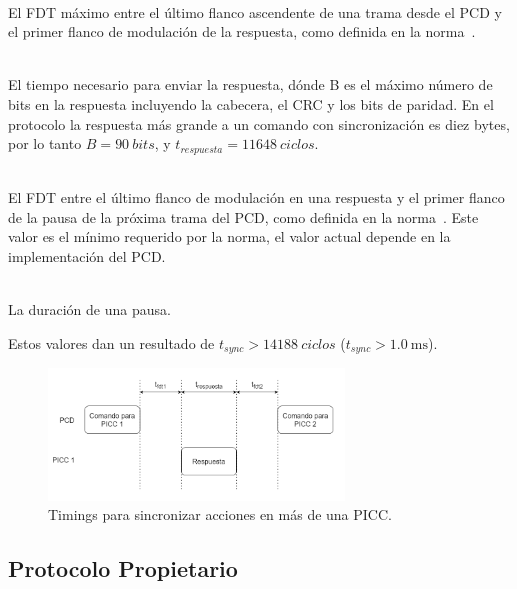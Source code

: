 \documentclass[a4paper, twoside, 11pt]{report}
\begin{document}
\begin{description}[font=\normalfont]
  \item[$t_{fdt1} = 1236$ ciclos:] \hfill \\ El FDT máximo entre el último flanco ascendente de una trama desde el PCD y el primer flanco de modulación de la respuesta, como definida en la norma~\cite{iso14443-3}.
  \item[$t_{respuesta} = 128 \left(B + 1\right)$ ciclos:] \hfill \\ El tiempo necesario para enviar la respuesta, dónde B es el máximo número de bits en la respuesta incluyendo la cabecera, el CRC y los bits de paridad. En el protocolo la respuesta más grande a un comando con sincronización es diez bytes, por lo tanto $B = \SI{90}{bits}$, y $t_{respuesta} = \SI{11648}{ciclos}$.
  \item[$t_{fdt2} = 1272$ ciclos:] \hfill \\ El FDT entre el último flanco de modulación en una respuesta y el primer flanco de la pausa de la próxima trama del PCD, como definida en la norma~\cite{iso14443-3}. Este valor es el mínimo requerido por la norma, el valor actual depende en la implementación del PCD.
  \item[$t_p \approx 32$ ciclos:] \hfill \\ La duración de una pausa.
\end{description}

Estos valores dan un resultado de $t_{sync} > \SI{14188}{ciclos}$ ($t_{sync} > \SI{1.0}{\milli\second}$).

\begin{figure}[htb]
  \centering
  \includegraphics[width=0.7\textwidth]{./img/app_synch3.drawio}
  \caption{Timings para sincronizar acciones en más de una PICC.}
  \label{fig:app_synch}
\end{figure}

\FloatBarrier
\subsection{Protocolo Propietario}
\end{document}
